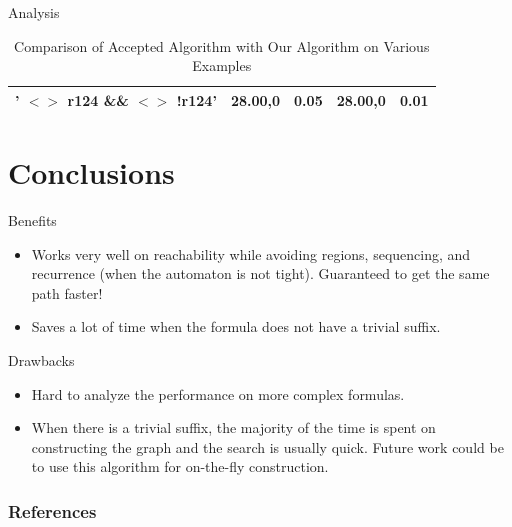 \documentclass{beamer}
\begin{document}
\begin{frame}{Analysis}
\begin{table}[]
{\begin{tabular}{|c|c|c|c|c|}
      ' $<>$ r124 \&\& $<>$ !r124' &	28.00,0	&	0.05 	&	28.00,0	&	0.01	\\		\hline
\end{tabular}}
\caption{Comparison of Accepted Algorithm with Our Algorithm on Various Examples}
\label{table}
\end{table}
\end{frame}


\section{Conclusions}
\begin{frame}{Benefits}
\begin{itemize}
\item Works very well on reachability while avoiding regions, sequencing, and recurrence (when the automaton is not tight). Guaranteed to get the same path faster!
\item Saves a lot of time when the formula does not have a trivial suffix.
\end{itemize}
\end{frame}

\begin{frame}{Drawbacks}
\begin{itemize}
\item Hard to analyze the performance on more complex formulas.
\item When there is a trivial suffix, the majority of the time is spent on constructing the graph and the search is usually quick. Future work could be to use this algorithm for on-the-fly construction. 
\end{itemize}


\end{frame}


\begin{frame}[allowframebreaks]
        \frametitle{References}
        
        
\end{frame}
\end{document}
